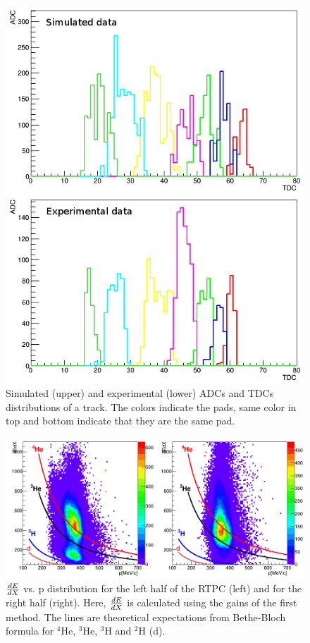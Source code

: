 \documentclass[twocolumn,showpacs,superscriptaddress,groupedaddress]{revtex4}
\begin{document}
\begin{figure}[tb]
\includegraphics[scale=0.350]{fig/EVENT_adc_tdc.png}
\caption{Simulated (upper) and experimental (lower) ADCs and TDCs distributions 
of a track. The colors indicate the pads, same color in top and bottom indicate 
that they are the same pad.}
\label{fig:EVENT_adc_tdc}
\end{figure}

\begin{figure}[tb]
   \includegraphics[scale=0.26]{fig/dedx_p_exp_1st.png}
   \caption{$\small{\frac{dE}{dX}}$ vs. p distribution for the left half of the 
      RTPC (left) and for the right half (right). Here, $\small{\frac{dE}{dX}}$ 
   is calculated using the gains of the first method.  The lines are 
theoretical expectations from Bethe-Bloch formula for $^4$He, $^3$He, $^3$H and 
$^2$H (d).}
\label{fig:dedx_p_exp_1st}
\end{figure}
\end{document}
